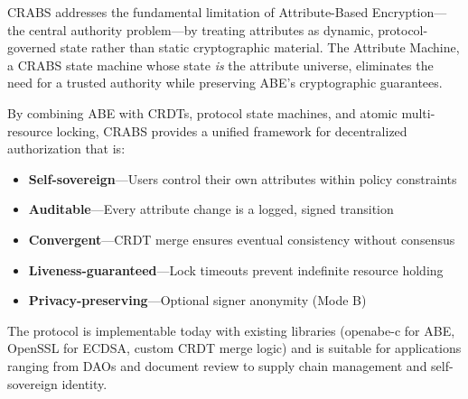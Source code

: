 \documentclass[sigconf,nonacm]{acmart}
\newcommand{\crab}{\textsc{CRABS}}
\begin{document}
\crab{} addresses the fundamental limitation of Attribute-Based Encryption---the central authority problem---by treating attributes as dynamic, protocol-governed state rather than static cryptographic material. The Attribute Machine, a \crab{} state machine whose state \textit{is} the attribute universe, eliminates the need for a trusted authority while preserving ABE's cryptographic guarantees.

By combining ABE with CRDTs, protocol state machines, and atomic multi-resource locking, \crab{} provides a unified framework for decentralized authorization that is:

\begin{itemize}
    \item \textbf{Self-sovereign}---Users control their own attributes within policy constraints
    \item \textbf{Auditable}---Every attribute change is a logged, signed transition
    \item \textbf{Convergent}---CRDT merge ensures eventual consistency without consensus
    \item \textbf{Liveness-guaranteed}---Lock timeouts prevent indefinite resource holding
    \item \textbf{Privacy-preserving}---Optional signer anonymity (Mode B)
\end{itemize}

The protocol is implementable today with existing libraries (openabe-c for ABE, OpenSSL for ECDSA, custom CRDT merge logic) and is suitable for applications ranging from DAOs and document review to supply chain management and self-sovereign identity.
\end{document}
